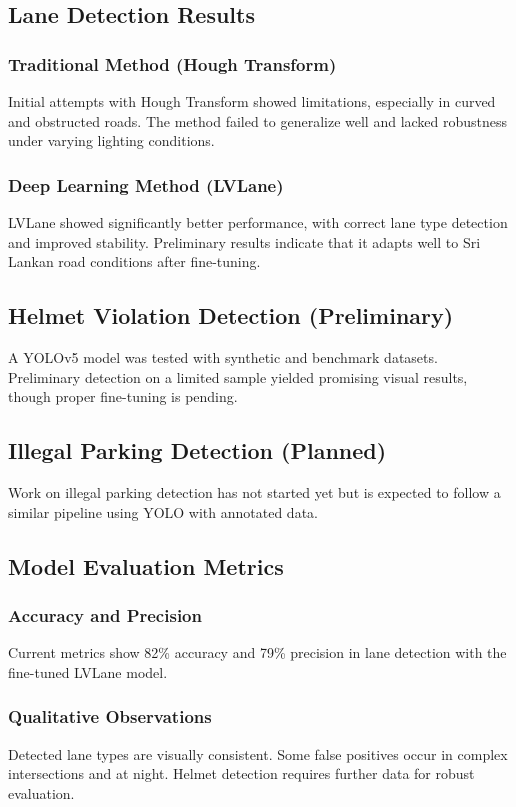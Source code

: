 \documentclass[12pt,a4paper]{article}
\begin{document}
\subsection{Lane Detection Results}

\subsubsection{Traditional Method (Hough Transform)}
Initial attempts with Hough Transform showed limitations, especially in curved and obstructed roads. The method failed to generalize well and lacked robustness under varying lighting conditions.

\subsubsection{Deep Learning Method (LVLane)}
LVLane showed significantly better performance, with correct lane type detection and improved stability. Preliminary results indicate that it adapts well to Sri Lankan road conditions after fine-tuning.

\subsection{Helmet Violation Detection (Preliminary)}
A YOLOv5 model was tested with synthetic and benchmark datasets. Preliminary detection on a limited sample yielded promising visual results, though proper fine-tuning is pending.

\subsection{Illegal Parking Detection (Planned)}
Work on illegal parking detection has not started yet but is expected to follow a similar pipeline using YOLO with annotated data.

\subsection{Model Evaluation Metrics}

\subsubsection{Accuracy and Precision}
Current metrics show 82\% accuracy and 79\% precision in lane detection with the fine-tuned LVLane model.

\subsubsection{Qualitative Observations}
Detected lane types are visually consistent. Some false positives occur in complex intersections and at night. Helmet detection requires further data for robust evaluation.
\end{document}
